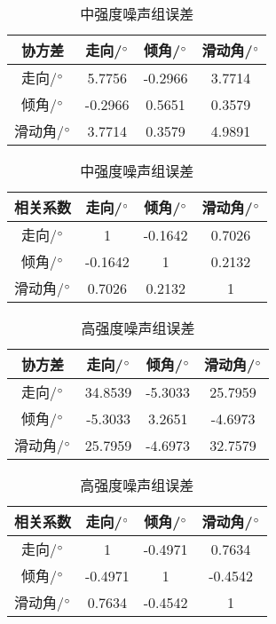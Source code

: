 \begin{table}[ht]
\centering
\caption{中强度噪声组误差}
\label{tab3_02}
    \begin{tabular}{c c c c}
    \hline
    协方差 & 走向/$^\circ$ & 倾角/$^\circ$ & 滑动角/$^\circ$ \\
    \hline
	走向/$^\circ$ 		&5.7756 	&-0.2966	&3.7714\\
	倾角/$^\circ$		&-0.2966	&0.5651		&0.3579\\
	滑动角/$^\circ$	&3.7714		&0.3579		&4.9891\\
    \hline
    \end{tabular}
    \begin{tabular}{c c c c}
    \hline
    相关系数 & 走向/$^\circ$ & 倾角/$^\circ$ & 滑动角/$^\circ$ \\
    \hline
	走向/$^\circ$ 		&1 			&-0.1642	&0.7026\\
	倾角/$^\circ$		&-0.1642	&1			&0.2132\\
	滑动角/$^\circ$	&0.7026		&0.2132		&1\\
    \hline
    \end{tabular}
\end{table}

\begin{table}[ht]
\centering
\caption{高强度噪声组误差}
\label{tab3_03}
    \begin{tabular}{c c c c}
    \hline
    协方差 & 走向/$^\circ$ & 倾角/$^\circ$ & 滑动角/$^\circ$ \\
    \hline
	走向/$^\circ$ 		&34.8539 	&-5.3033	&25.7959\\
	倾角/$^\circ$		&-5.3033	&3.2651		&-4.6973\\
	滑动角/$^\circ$	&25.7959	&-4.6973	&32.7579\\
    \hline
    \end{tabular}
    \begin{tabular}{c c c c}
    \hline
    相关系数 & 走向/$^\circ$ & 倾角/$^\circ$ & 滑动角/$^\circ$ \\
    \hline
	走向/$^\circ$ 		&1 			&-0.4971	&0.7634\\
	倾角/$^\circ$		&-0.4971	&1			&-0.4542\\
	滑动角/$^\circ$	&0.7634		&-0.4542		&1\\
    \hline
    \end{tabular}
\end{table}

